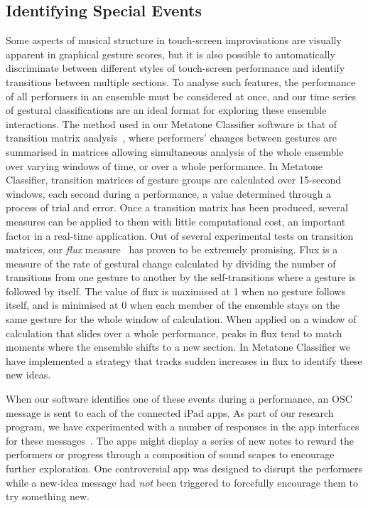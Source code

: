 \documentclass[graybox]{svmult}
\begin{document}


\subsection{Identifying Special Events}
\label{subsec:special-events}

Some aspects of musical structure in touch-screen improvisations are
visually apparent in graphical gesture scores, but it is also possible
to automatically discriminate between different styles of touch-screen
performance and identify transitions between multiple sections. To
analyse such features, the performance of all performers in an
ensemble must be considered at once, and our time series of gestural
classifications are an ideal format for exploring these ensemble
interactions. The method used in our Metatone Classifier software is
that of transition matrix analysis~\cite{Swift:2014tya}, where
performers' changes between gestures are summarised in matrices
allowing simultaneous analysis of the whole ensemble over varying
windows of time, or over a whole performance. In Metatone Classifier,
transition matrices of gesture groups are calculated over 15-second windows, each second
during a performance, a value determined through a process of trial
and error. Once a transition matrix has been produced, several
measures can be applied to them with little computational cost, an
important factor in a real-time application. Out of several
experimental tests on transition matrices, our \emph{flux} measure~\cite{Martin:2015jk} has
proven to be extremely promising. Flux is a measure of the rate of
gestural change calculated by dividing the number of transitions from
one gesture to another by the self-transitions where a gesture is
followed by itself. The value of flux is maximised at 1 when no
gesture follows itself, and is minimised at 0 when each member of the
ensemble stays on the same gesture for the whole window of
calculation. When applied on a window of calculation that slides over
a whole performance, peaks in flux tend to match moments where the
ensemble shifts to a new section. In Metatone Classifier we have
implemented a strategy that tracks sudden increases in flux to
identify these new ideas.

When our software identifies one of these events during a performance,
an OSC message is sent to each of the connected iPad apps. As part of
our research program, we have experimented with a number of responses
in the app interfaces for these messages~\cite{Martin:2015jk}. The
apps might display a series of new notes to reward the performers or
progress through a composition of sound scapes to encourage further
exploration. One controversial app was designed to disrupt the
performers while a new-idea message had \emph{not} been triggered to
forcefully encourage them to try something new.
\end{document}

